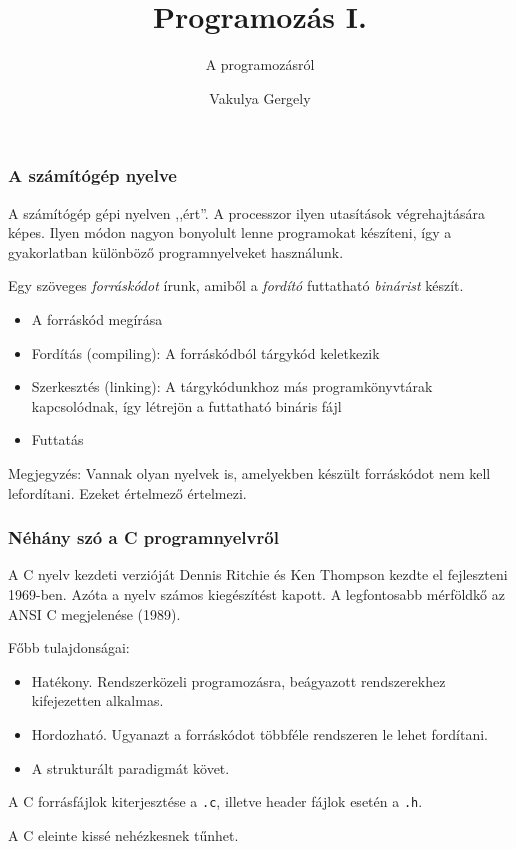 \documentclass[
	11pt, %
]{beamer}
\title{Programozás I.}
\subtitle{A programozásról}
\author{Vakulya Gergely}
\institute[UC]{Óbudai Egyetem, AMK \\ \smallskip \textit{vakulya.gergely@amk.uni-obuda.hu}}
\date{}
\begin{document}
\begin{frame}

  \titlepage

\end{frame}

\begin{frame}
  \frametitle{A számítógép nyelve}

  A számítógép gépi nyelven ,,ért''. A processzor ilyen utasítások végrehajtására képes. Ilyen módon nagyon bonyolult lenne programokat készíteni, így a gyakorlatban különböző programnyelveket használunk.

  Egy szöveges \emph{forráskódot} írunk, amiből a \emph{fordító} futtatható \emph{binárist} készít.

  \begin{itemize}
    \item{A forráskód megírása}
    \item{Fordítás (compiling): A forráskódból tárgykód keletkezik}
    \item{Szerkesztés (linking): A tárgykódunkhoz más programkönyvtárak kapcsolódnak, így létrejön a futtatható bináris fájl}
    \item{Futtatás}
  \end{itemize}

  Megjegyzés: Vannak olyan nyelvek is, amelyekben készült forráskódot nem kell lefordítani. Ezeket értelmező értelmezi.

\end{frame}

\begin{frame}
  \frametitle{Néhány szó a C programnyelvről}

  A C nyelv kezdeti verzióját Dennis Ritchie és Ken Thompson kezdte el fejleszteni 1969-ben. Azóta a nyelv számos kiegészítést kapott. A legfontosabb mérföldkő az ANSI C megjelenése (1989).

  Főbb tulajdonságai:

  \begin{itemize}
    \item{Hatékony. Rendszerközeli programozásra, beágyazott rendszerekhez kifejezetten alkalmas.}
    \item{Hordozható. Ugyanazt a forráskódot többféle rendszeren le lehet fordítani.}
    \item{A strukturált paradigmát követ.}
  \end{itemize}

  A C forrásfájlok kiterjesztése a \texttt{.c}, illetve header fájlok esetén a \texttt{.h}.

  A C eleinte kissé nehézkesnek tűnhet.

\end{frame}
\end{document}
